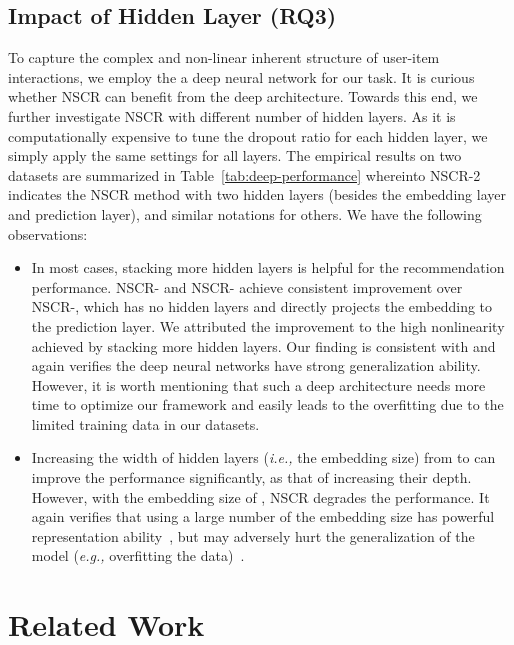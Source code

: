\documentclass[sigconf]{acmart}
\newcommand{\ie}{\emph{i.e., }}
\newcommand{\eg}{\emph{e.g., }}
\begin{document}
		\subsection{Impact of Hidden Layer (RQ3)}
		To capture the complex and non-linear inherent structure of user-item interactions, we employ the a deep neural network for our task. It is curious whether NSCR can benefit from the deep architecture. Towards this end, we further investigate NSCR with different number of hidden layers. As it is computationally expensive to tune the dropout ratio  for each hidden layer, we simply apply the same settings for all layers. The empirical results on two datasets are summarized in Table~\ref{tab:deep-performance} whereinto NSCR-2 indicates the NSCR method with two hidden layers (besides the embedding layer and prediction layer), and similar notations for others. We have the following observations:
		
		\begin{itemize}[leftmargin=*]
			\item In most cases, stacking more hidden layers is helpful for the recommendation performance. NSCR- and NSCR- achieve consistent improvement over NSCR-, which has no hidden layers and directly projects the embedding to the prediction layer. We attributed the improvement to the high nonlinearity achieved by stacking more hidden layers. Our finding is consistent with \cite{DBLP:conf/cvpr/HeZRS16} and again verifies the deep neural networks have strong generalization ability. However, it is worth mentioning that such a deep architecture needs more time to optimize our framework and easily leads to the overfitting due to the limited training data in our datasets.
			\item Increasing the width of hidden layers (\ie the embedding size) from  to  can improve the performance significantly, as that of increasing their depth. However, with the embedding size of , NSCR degrades the performance. It again verifies that using a large number of the embedding size has powerful representation ability~\cite{DBLP:conf/cvpr/HeZRS16}, but may adversely hurt the generalization of the model (\eg overfitting the data)~\cite{heneural,DBLP:conf/cvpr/HeZRS16}.
		\end{itemize}
		
		
		
\section{Related Work}
\end{document}
